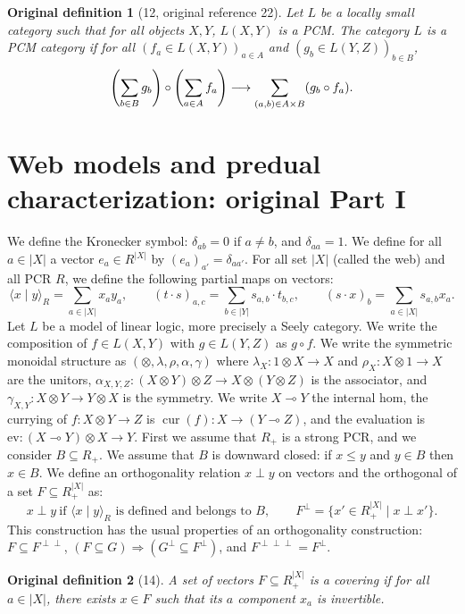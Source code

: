 \documentclass[10pt,a4paper]{article}
\newcommand{\lolli}{\multimap}
\newcommand{\cur}{\operatorname{cur}}
\newcommand{\dimp}{\mathrel{\relbar\joinrel\rightarrow}}
\newcommand{\scalar}[2]{\langle #1\mid #2\rangle}
\newtheorem*{originaldef}{Original definition}
\begin{document}
\begin{originaldef}[12, original reference 22]
Let $L$ be a locally small category such that for all objects $X,Y$, $L(X,Y)$ is a PCM. The category $L$ is a PCM category if for all $(f_a\in L(X,Y))_{a\in A}$ and $(g_b\in L(Y,Z))_{b\in B}$,
\[\left(\sum_{b\in B}g_b\right)\circ\left(\sum_{a\in A}f_a\right)\dimp\sum_{(a,b)\in A\times B}(g_b\circ f_a).\]
\end{originaldef}
\section*{Web models and predual characterization: original Part I}
We define the Kronecker symbol: $\delta_{ab}=0$ if $a\ne b$, and $\delta_{aa}=1$. We define for all $a\in |X|$ a vector $e_a\in R^{|X|}$ by $(e_a)_{a'}=\delta_{aa'}$. For all set $|X|$ (called the web) and all PCR $R$, we define the following partial maps on vectors:
\[\scalar{x}{y}_R=\sum_{a\in|X|}x_ay_a,\qquad (t\cdot s)_{a,c}=\sum_{b\in|Y|}s_{a,b}\cdot t_{b,c},\qquad(s\cdot x)_b=\sum_{a\in|X|}s_{a,b}x_a.\]
Let $L$ be a model of linear logic, more precisely a Seely category. We write the composition of $f\in L(X,Y)$ with $g\in L(Y,Z)$ as $g\circ f$. We write the symmetric monoidal structure as $(\otimes,\lambda,\rho,\alpha,\gamma)$ where $\lambda_X:1\otimes X\to X$ and $\rho_X:X\otimes1\to X$ are the unitors, $\alpha_{X,Y,Z}:(X\otimes Y)\otimes Z\to X\otimes(Y\otimes Z)$ is the associator, and $\gamma_{X,Y}:X\otimes Y\to Y\otimes X$ is the symmetry. We write $X\lolli Y$ the internal hom, the currying of $f:X\otimes Y\to Z$ is $\cur(f):X\to(Y\lolli Z)$, and the evaluation is $\mathrm{ev}:(X\lolli Y)\otimes X\to Y$.
First we assume that $R_+$ is a strong PCR, and we consider $B\subseteq R_+$. We assume that $B$ is downward closed: if $x\leq y$ and $y\in B$ then $x\in B$. We define an orthogonality relation $x\perp y$ on vectors and the orthogonal of a set $F\subseteq R_+^{|X|}$ as:
\[x\perp y\ \text{if }\scalar{x}{y}_R\text{ is defined and belongs to }B,\qquad F^\perp=\{x'\in R_+^{|X|}\mid x\perp x'\}.\]
This construction has the usual properties of an orthogonality construction: $F\subseteq F^{\perp\perp}$, $(F\subseteq G)\Rightarrow(G^\perp\subseteq F^\perp)$, and $F^{\perp\perp\perp}=F^\perp$.
\begin{originaldef}[14] A set of vectors $F\subseteq R_+^{|X|}$ is a covering if for all $a\in|X|$, there exists $x\in F$ such that its $a$ component $x_a$ is invertible.\end{originaldef}
\end{document}
